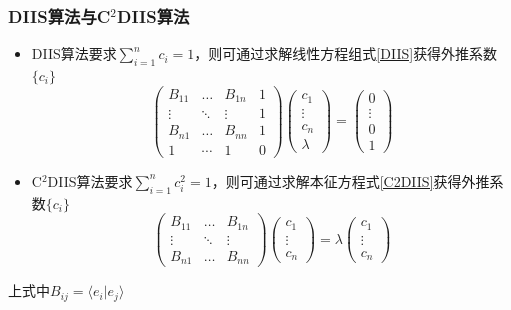 \documentclass[10pt,aspectratio=43,mathserif,UTF8]{beamer}
\begin{document}
\begin{frame}
	\frametitle{DIIS算法与C$^2$DIIS算法}

	\begin{itemize}
		\item DIIS算法要求$\sum_{i=1}^{n} c_i = 1$，则可通过求解线性方程组式\ref{DIIS}获得外推系数$\{c_i\}$
		\begin{equation}
		\begin{pmatrix}
		B_{11} & \ldots & B_{1n} & 1 \\
		\vdots & \ddots & \vdots & 1 \\
		B_{n1} & \ldots & B_{nn} & 1 \\
		1 & \cdots & 1 & 0
		\end{pmatrix}
		\begin{pmatrix}
		c_{1}\\
		\vdots\\
		c_{n}\\
		\lambda 
		\end{pmatrix}
		=
		\begin{pmatrix}
		0\\
		\vdots\\
		0\\
		1
		\end{pmatrix}
		\label{DIIS}
		\end{equation}
		\item C$^2$DIIS算法要求$\sum_{i=1}^{n} c_i^2 = 1$，则可通过求解本征方程式\ref{C2DIIS}获得外推系数$\{c_i\}$
		\begin{equation}
		\begin{pmatrix}
		B_{11} & \ldots & B_{1n} \\
		\vdots & \ddots & \vdots \\
		B_{n1} & \ldots & B_{nn} 
		\end{pmatrix}
		\begin{pmatrix}
		c_{1}\\
		\vdots\\
		c_{n}
		\end{pmatrix}
		=
		\lambda 
		\begin{pmatrix}
		c_{1}\\
		\vdots\\
		c_{n}
		\end{pmatrix}
		\label{C2DIIS}
		\end{equation}
	\end{itemize}
	上式中${B_{ij}} = \langle  e_{i} |  e_{j}  \rangle$
\end{frame}
\end{document}
